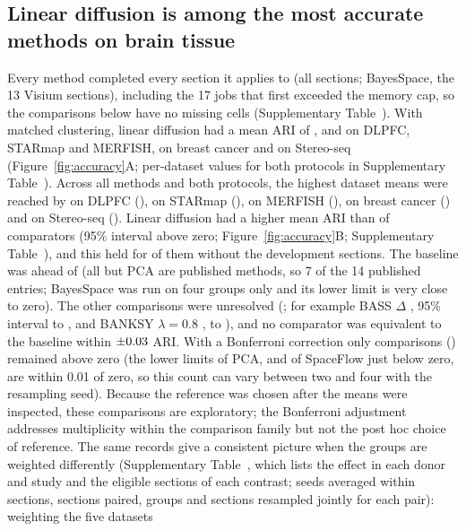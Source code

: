 \documentclass[unnumsec,webpdf,contemporary,large]{oup-authoring-template}
\newcommand{\figref}[1]{Figure~\ref{#1}}
\begin{document}
\subsection{Linear diffusion is among the most accurate methods on brain tissue}
Every method completed every section it applies to (all \nSections{} sections; BayesSpace, the 13 Visium sections), including the 17 jobs that first exceeded the memory cap, so the comparisons below have no missing cells (Supplementary Table~\STcov).
With matched clustering, linear diffusion had a mean ARI of \meanLinDlpfc, \meanLinStarmap{} and \meanLinMerfish{} on DLPFC,
STARmap and MERFISH, \meanLinBrca{} on breast cancer and \meanLinStereo{} on Stereo-seq (\figref{fig:accuracy}A; per-dataset
values for both protocols in Supplementary Table~\STari). Across all methods and both protocols, the highest dataset means were
reached by \bestDlpfc{} on DLPFC (\bestDlpfcVal), \bestStarmap{} on STARmap (\bestStarmapVal), \bestMerfish{} on MERFISH
(\bestMerfishVal), \bestBrca{} on breast cancer (\bestBrcaVal) and \bestStereo{} on Stereo-seq (\bestStereoVal). Linear diffusion had a higher mean ARI than
\nRobBetter{} of \nRobTot{} comparators (95\% interval above zero; \figref{fig:accuracy}B; Supplementary Table~\STstatsrob), and
this held for \nRobBetterTest{} of them without the development sections. The baseline was ahead of \listRobBetter{} (all but PCA are published methods, so 7 of the 14 published entries; BayesSpace was run on four groups only and its lower limit is very close to zero). The other
\nRobUnres{} comparisons were unresolved (\listRobUnres; for example BASS $\Delta$ \robDBass, 95\% interval \robLoBass{} to
\robHiBass, and BANKSY $\lambda=0.8$ \robDBanksyHi, \robLoBanksyHi{} to \robHiBanksyHi), and no comparator was equivalent to the
baseline within $\pm0.03$ ARI. With a Bonferroni correction only \nRobBetterBonf{} comparisons (\listRobBetterBonf)
remained above zero (the lower limits of PCA, and of SpaceFlow just below zero, are within 0.01 of zero, so this count can vary between two and four with the resampling seed). Because the reference was chosen after the means were inspected, these comparisons are exploratory; the Bonferroni adjustment addresses
multiplicity within the comparison family but not the post hoc choice of reference. The same records give a consistent picture when the groups
are weighted differently (Supplementary Table~\STpaired, which lists the effect in each donor and study and the eligible sections of each
contrast; seeds averaged within sections, sections paired, groups and sections resampled jointly for each pair): weighting the five datasets
\end{document}
